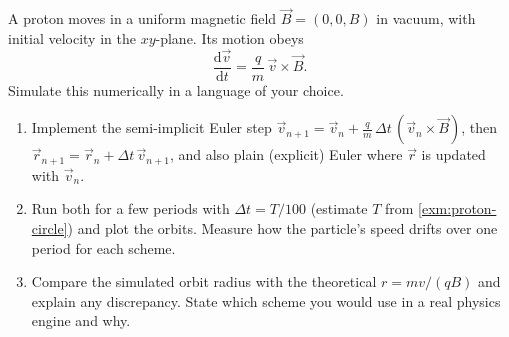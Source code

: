 \begin{exercise}\label{ex:em-8}
A proton moves in a uniform magnetic field $\vec{B} = (0,0,B)$ in vacuum, with initial velocity in the $xy$-plane. Its motion obeys
\[
  \frac{\mathrm{d}\vec{v}}{\mathrm{d}t} = \frac{q}{m}\,\vec{v}\times\vec{B}.
\]
Simulate this numerically in a language of your choice.
\begin{enumerate}[label=(\alph*)]
  \item Implement the semi-implicit Euler step $\vec{v}_{n+1} = \vec{v}_n + \frac{q}{m}\,\Delta t\,(\vec{v}_n\times\vec{B})$, then $\vec{r}_{n+1} = \vec{r}_n + \Delta t\,\vec{v}_{n+1}$, and also plain (explicit) Euler where $\vec{r}$ is updated with $\vec{v}_n$.
  \item Run both for a few periods with $\Delta t = T/100$ (estimate $T$ from \cref{exm:proton-circle}) and plot the orbits. Measure how the particle's speed drifts over one period for each scheme.
  \item Compare the simulated orbit radius with the theoretical $r = mv/(qB)$ and explain any discrepancy. State which scheme you would use in a real physics engine and why.
\end{enumerate}
\end{exercise}
